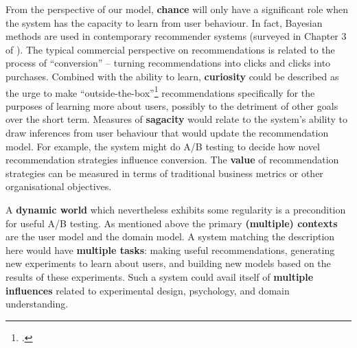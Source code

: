 From the perspective of our model, \textbf{chance} will only have a
significant role when the system has the capacity to learn from user
behaviour.  In fact, Bayesian methods are used in contemporary
recommender systems (surveyed in Chapter 3 of
).  The typical commercial perspective on
recommendations is related to the process of ``conversion'' -- turning
recommendations into clicks and clicks into purchases.  Combined with
the ability to learn, \textbf{curiosity} could be described as the
urge to make ``outside-the-box''\footnote{.}
recommendations specifically for the purposes of learning more about
users, possibly to the detriment of other goals over the short term.
Measures of \textbf{sagacity} would relate to the system's ability to
draw inferences from user behaviour that would update the
recommendation model.  For example, the system might do A/B testing to
decide how novel recommendation strategies influence conversion.  The
\textbf{value} of recommendation strategies can be measured in terms
of traditional business metrics or other organisational objectives.

A \textbf{dynamic world} which nevertheless exhibits some regularity
is a precondition for useful A/B testing.  As mentioned above the
primary \textbf{(multiple) contexts} are the user model and the domain
model.  A system matching the description here would have
\textbf{multiple tasks}: making useful recommendations, generating new
experiments to learn about users, and building new models based on the
results of these experiments.  Such a system could avail itself of
\textbf{multiple influences} related to experimental design,
psychology, and domain understanding.

